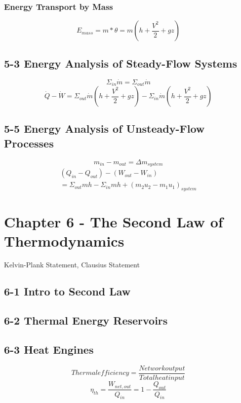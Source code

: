 \documentclass[10pt,landscape]{article}
\begin{document}
\begin{multicols}{3}
\subsubsection{Energy Transport by Mass}
\begin{equation}
    E_{mass}=m*\theta=m(h+\frac{V^2}{2}+gz)
\end{equation}
\subsection{5-3 Energy Analysis of Steady-Flow Systems}
\begin{equation}
    \Sigma_{in}\dot{m}=\Sigma_{out}\dot{m}
\end{equation}
\begin{equation}
    \dot{Q}-\dot{W}=\Sigma_{out}\dot{m}(h+\frac{V^2}{2}+gz)-\Sigma_{in}\dot{m}(h+\frac{V^2}{2}+gz)
\end{equation}
\subsection{5-5 Energy Analysis of Unsteady-Flow Processes}
\begin{equation}
    m_{in}-m_{out}=\Delta m_{system}
\end{equation}
\begin{equation}
    \begin{split}
        (Q_{in}-Q_{out})-(W_{out}-W_{in})\\
        =\Sigma_{out}mh-\Sigma_{in}mh+(m_2u_2-m_1u_1)_{system}
    \end{split}
\end{equation}

\section{Chapter 6 - The Second Law of Thermodynamics}
Kelvin-Plank Statement, Clausius Statement
\subsection{6-1 Intro to Second Law}
\subsection{6-2 Thermal Energy Reservoirs}
\subsection{6-3 Heat Engines}
\begin{equation}
    Thermal efficiency = \frac{Net work output}{Total heat input}
\end{equation}
\begin{equation}
    \eta_{th}=\frac{W_{net,out}}{Q_{in}}=1-\frac{Q_{out}}{Q_{in}}
\end{equation}

\end{multicols}
\end{document}
